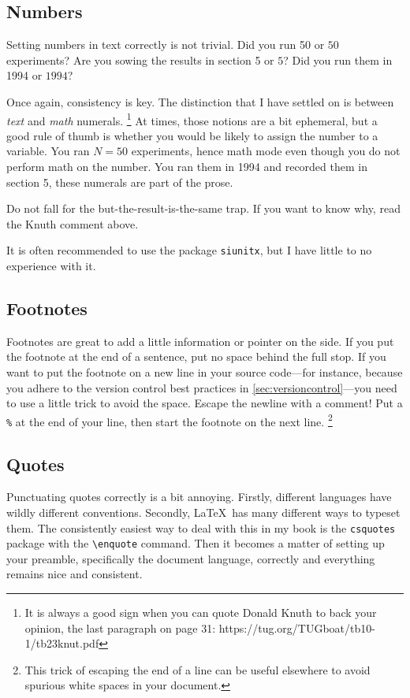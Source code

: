 \subsection{Numbers}
Setting numbers in text correctly is not trivial.
Did you run 50 or $50$ experiments?
Are you sowing the results in section 5 or $5$?
Did you run them in 1994 or $1994$?

Once again, consistency is key.
The distinction that I have settled on is between \emph{text} and \emph{math} numerals.%
\footnote{It is always a good sign when you can quote Donald Knuth to back your opinion, \cf the last paragraph on page 31: https://tug.org/TUGboat/tb10-1/tb23knut.pdf}
At times, those notions are a bit ephemeral, but a good rule of thumb is whether you would be likely to assign the number to a variable.
You ran $N=50$ experiments, hence math mode even though you do not perform math on the number.
You ran them in 1994 and recorded them in section 5, these numerals are part of the prose.

Do not fall for the but-the-result-is-the-same trap.
If you want to know why, read the Knuth comment above.

It is often recommended to use the package \verb|siunitx|, but I have little to no experience with it.

\subsection{Footnotes}
Footnotes are great to add a little information or pointer on the side.
If you put the footnote at the end of a sentence, put no space behind the full stop.
If you want to put the footnote on a new line in your source code---for instance, because you adhere to the version control best practices in \cref{sec:versioncontrol}---you need to use a little trick to avoid the space.
Escape the newline with a comment!
Put a \texttt{\%} at the end of your line, then start the footnote on the next line.%
\footnote{
	This trick of escaping the end of a line can be useful elsewhere to avoid spurious white spaces in your document.
}


\subsection{Quotes}
Punctuating quotes correctly is a bit annoying.
Firstly, different languages have wildly different conventions.
Secondly, \LaTeX\ has many different ways to typeset them.
The consistently easiest way to deal with this in my book is the \verb|csquotes| package with the \verb|\enquote| command.
Then it becomes a matter of setting up your preamble, specifically the document language, correctly and everything remains nice and consistent.



